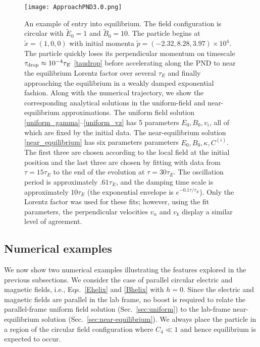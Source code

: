 \documentclass[amsmath,amssymb,nofootinbib,notitlepage,superscriptaddress,twocolumn]{revtex4-2}
\begin{document}
\begin{figure*}
    \centering
    \texttt{[image: ApproachPND3.0.png]}\\
    \caption{An example of entry into equilibrium.  The field configuration is circular with $\tilde{E}_0=1$ and $\tilde{B}_0=10$.  The particle begins at $\tilde{x}=(1,0,0)$ with initial momenta $\tilde{p}=(-2.32,8.28,3.97) \times 10^4$.  The particle quickly loses its perpendicular momentum on timescale $\tau_{\rm drop} \approx 10^{-4} \tau_E$ \eqref{taudrop} before accelerating along the PND to near the equilibrium Lorentz factor over several $\tau_E$ and finally approaching the equilibrium in a weakly damped exponential fashion.  Along with the numerical trajectory, we show the corresponding analytical solutions in the uniform-field and near-equilibrium approximations.  The uniform field solution \eqref{uniform_gamma}--\eqref{uniform_vz} has 5 parameters $E_0, B_0, v_i$, all of which are fixed by the initial data.  The near-equilibrium solution \eqref{near_equilibrium} has six parameters parameters $E_0,B_0,\kappa,C^{(i)}$.  The first three are chosen according to the local field at the initial position and the last three are chosen by fitting with data from $\tau=15\tau_E$ to the end of the evolution at $\tau=30\tau_E$.  The oscillation period is approximately $.61 \tau_E$, and the damping time scale is approximately $10 \tau_E$ (the exponential envelope is $e^{-0.1 \tau/\tau_E}$).  Only the Lorentz factor was used for these fits; however, using the fit parameters, the perpendicular velocities $v_n$ and $v_k$ display a similar level of agreement.
    }
    \label{fig:gammaperp}
\end{figure*}

\subsection{Numerical examples}

We now show two numerical examples illustrating the features explored in the previous subsections.  We consider the case of parallel circular electric and magnetic fields, i.e., Eqs.~\eqref{Ehelix} and \eqref{Bhelix} with $h=0$.  Since the electric and magnetic fields are parallel in the lab frame, no  boost is required to relate the parallel-frame uniform field solution (Sec.~\ref{sec:uniform}) to the lab-frame near-equilibrium solution (Sec.~\ref{sec:near-equilibrium}).  We always place the particle in a region of the circular field configuration where $C_4\ll1$ and hence equilibrium is expected to occur.
\end{document}
